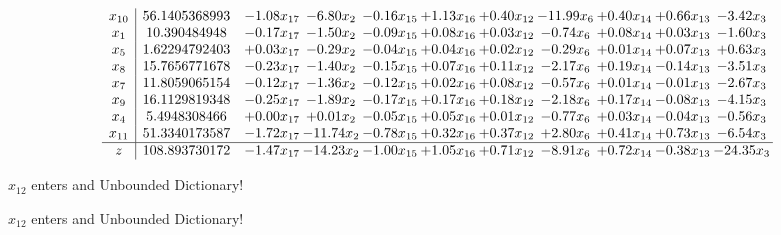 \documentclass[9pt]{article}
\begin{document}
 \[\begin{array}{c| c c@{\hskip 2pt} c@{\hskip 2pt} c@{\hskip 2pt} c@{\hskip 2pt} c@{\hskip 2pt} c@{\hskip 2pt} c@{\hskip 2pt} c@{\hskip 2pt} c@{\hskip 2pt} }
 x_{10}   &  56.1405368993 & -1.08 x_{17} & -6.80 x_{2} & -0.16 x_{15} & +  1.13 x_{16} & +  0.40 x_{12} & -11.99 x_{6} & +  0.40 x_{14} & +  0.66 x_{13} & -3.42 x_{3}\\
 x_{1}   &  10.390484948 & -0.17 x_{17} & -1.50 x_{2} & -0.09 x_{15} & +  0.08 x_{16} & +  0.03 x_{12} & -0.74 x_{6} & +  0.08 x_{14} & +  0.03 x_{13} & -1.60 x_{3}\\
 x_{5}   &  1.62294792403 & +  0.03 x_{17} & -0.29 x_{2} & -0.04 x_{15} & +  0.04 x_{16} & +  0.02 x_{12} & -0.29 x_{6} & +  0.01 x_{14} & +  0.07 x_{13} & +  0.63 x_{3}\\
 x_{8}   &  15.7656771678 & -0.23 x_{17} & -1.40 x_{2} & -0.15 x_{15} & +  0.07 x_{16} & +  0.11 x_{12} & -2.17 x_{6} & +  0.19 x_{14} & -0.14 x_{13} & -3.51 x_{3}\\
 x_{7}   &  11.8059065154 & -0.12 x_{17} & -1.36 x_{2} & -0.12 x_{15} & +  0.02 x_{16} & +  0.08 x_{12} & -0.57 x_{6} & +  0.01 x_{14} & -0.01 x_{13} & -2.67 x_{3}\\
 x_{9}   &  16.1129819348 & -0.25 x_{17} & -1.89 x_{2} & -0.17 x_{15} & +  0.17 x_{16} & +  0.18 x_{12} & -2.18 x_{6} & +  0.17 x_{14} & -0.08 x_{13} & -4.15 x_{3}\\
 x_{4}   &  5.4948308466 & +  0.00 x_{17} & +  0.01 x_{2} & -0.05 x_{15} & +  0.05 x_{16} & +  0.01 x_{12} & -0.77 x_{6} & +  0.03 x_{14} & -0.04 x_{13} & -0.56 x_{3}\\
 x_{11}   &  51.3340173587 & -1.72 x_{17} & -11.74 x_{2} & -0.78 x_{15} & +  0.32 x_{16} & +  0.37 x_{12} & +  2.80 x_{6} & +  0.41 x_{14} & +  0.73 x_{13} & -6.54 x_{3}\\
\hline
z    &  108.893730172 & -1.47 x_{17} & -14.23 x_{2} & -1.00 x_{15} & +  1.05 x_{16} & +  0.71 x_{12} & -8.91 x_{6} & +  0.72 x_{14} & -0.38 x_{13} & -24.35 x_{3}\\
\end{array}\]


 $ x_{12} $ enters and Unbounded Dictionary!


 $ x_{12} $ enters and Unbounded Dictionary!
\end{document}
